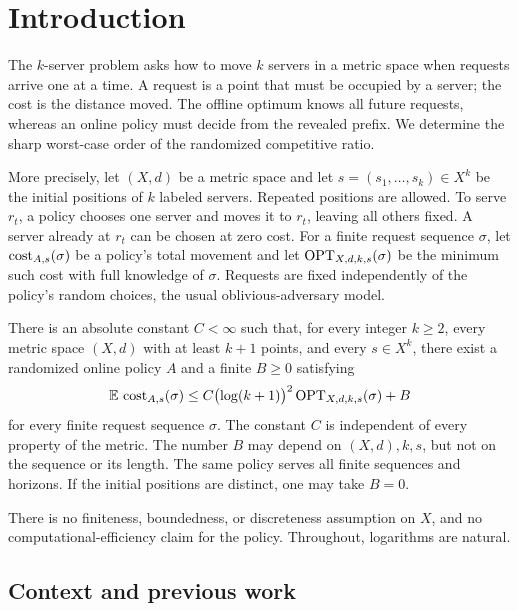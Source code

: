 \section{Introduction}\label{sec:introduction}

The \(k\)-server problem asks how to move \(k\) servers in a metric
space when requests arrive one at a time. A request is a point that
must be occupied by a server; the cost is the distance moved.
The offline optimum knows all future requests, whereas an online
policy must decide from the revealed prefix. We determine the sharp
worst-case order of the randomized competitive ratio.

More precisely, let \((X,d)\) be a metric space and let
\(s=(s_1,\ldots,s_k)\in X^k\) be the initial positions of \(k\)
labeled servers. Repeated positions are allowed. To serve \(r_t\),
a policy chooses one server and moves it to \(r_t\), leaving all
others fixed. A server already at \(r_t\) can be chosen at zero cost.
For a finite request sequence \(\sigma\), let
\(\operatorname{cost}_{A,s}(\sigma)\) be a policy's total movement and let
\(\operatorname{OPT}_{X,d,k,s}(\sigma)\) be the minimum such cost with full
knowledge of \(\sigma\). Requests are fixed independently of the
policy's random choices, the usual oblivious-adversary model.

\begin{theorem}\label{thm:main}
There is an absolute constant \(C<\infty\) such that, for every
integer \(k\ge2\), every metric space \((X,d)\) with at least \(k+1\)
points, and every \(s\in X^k\), there exist a randomized online policy
\(A\) and a finite \(B\ge0\) satisfying
\begin{equation}\label{eq:main}
 \mathbb E\,\operatorname{cost}_{A,s}(\sigma)
 \le C\bigl(\log(k+1)\bigr)^2\operatorname{OPT}_{X,d,k,s}(\sigma)+B
\end{equation}
for every finite request sequence \(\sigma\).
The constant \(C\) is independent of every property of the metric.
The number \(B\) may depend on \((X,d),k,s\), but not on the sequence
or its length. The same policy serves all finite sequences and
horizons. If the initial positions are distinct, one may take \(B=0\).
\end{theorem}

There is no finiteness, boundedness, or discreteness assumption on
\(X\), and no computational-efficiency claim for the policy.
Throughout, logarithms are natural.

\subsection{Context and previous work}

